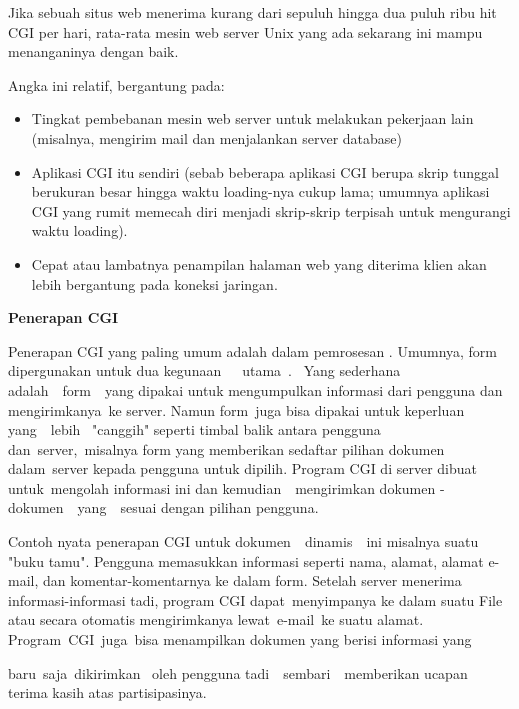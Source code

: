 \noindent 
Jika sebuah situs web menerima kurang dari sepuluh hingga dua puluh ribu hit CGI per hari, rata-rata mesin web server Unix yang ada sekarang ini mampu menanganinya dengan baik. \par
\noindent 
Angka ini relatif, bergantung pada: \par
\noindent 
\begin{itemize}
	\item Tingkat pembebanan mesin web server untuk melakukan pekerjaan lain (misalnya, mengirim mail dan menjalankan server database) \par
	\noindent 
	\item Aplikasi CGI itu sendiri (sebab beberapa aplikasi CGI berupa skrip tunggal berukuran besar hingga waktu loading-nya cukup lama; umumnya aplikasi CGI yang rumit memecah diri menjadi skrip-skrip terpisah untuk mengurangi waktu loading). \par
	\noindent 
	\item Cepat atau lambatnya penampilan halaman web yang diterima klien akan lebih bergantung pada koneksi jaringan.\end{itemize}
\par
\vspace{12pt}
\noindent 
\textbf{Penerapan CGI} \par
Penerapan CGI yang paling umum adalah dalam pemrosesan . Umumnya, form dipergunakan untuk dua kegunaan~~~utama~.~ Yang  sederhana  adalah~~form~~yang  dipakai  untuk mengumpulkan informasi dari pengguna dan mengirimkanya~ke server. Namun  form~juga bisa dipakai untuk keperluan  yang~~lebih~ "canggih"  seperti timbal balik antara pengguna dan~server,~misalnya  form  yang memberikan sedaftar pilihan dokumen dalam~server kepada pengguna  untuk dipilih. Program CGI di server dibuat untuk~mengolah informasi ini  dan kemudian~~mengirimkan  dokumen - dokumen~~yang~~sesuai  dengan  pilihan pengguna. \par
\vspace{12pt}
Contoh nyata penerapan CGI untuk dokumen~~dinamis~~ini  misalnya  suatu "buku tamu". Pengguna memasukkan informasi seperti nama, alamat, alamat e-mail, dan komentar-komentarnya ke dalam form. Setelah server menerima informasi-informasi tadi, program CGI dapat~menyimpanya ke dalam  suatu File atau secara otomatis mengirimkanya lewat~e-mail~ke  suatu  alamat. Program~CGI~juga~bisa menampilkan dokumen yang  berisi  informasi  yang \par
\noindent 
baru~saja~dikirimkan~ oleh  pengguna  tadi~~sembari~~memberikan  ucapan  terima kasih atas partisipasinya. \par
